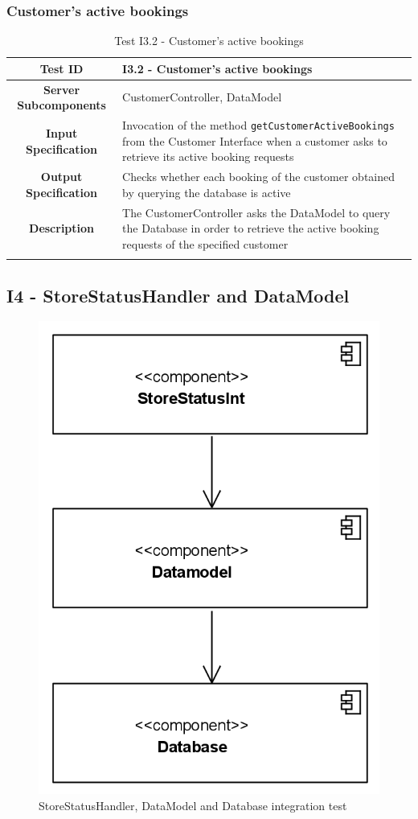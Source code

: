 \documentclass[a4paper,oneside,11pt]{book}
\begin{document}
    \subsubsection{Customer's active bookings}
    \begin{longtable}[c]{|>{\bfseries{}}c|H{.5\textwidth}|}
        \hline
        Test ID & I3.2 - Customer's active bookings \\ \hline
        Server Subcomponents & CustomerController, DataModel \\ \hline
        Input Specification & Invocation of the method \texttt{getCustomerActiveBookings} from the Customer Interface when a customer asks to retrieve its active booking requests \\ \hline
        Output Specification & Checks whether each booking of the customer obtained by querying the database is active \\ \hline
        Description & The CustomerController asks the DataModel to query the Database in order to retrieve the active booking requests of the specified customer \\ \hline
        \caption{Test I3.2 - Customer's active bookings}
        \label{table:test_I3.2}
    \end{longtable}
    
    \subsection{I4 - StoreStatusHandler and DataModel}
    \begin{figure}[H]
        \centering
        \includegraphics[width=.5\textwidth, height=\textheight, keepaspectratio]{pictures/integration_diagrams/integration_storestatushandler_datamodel.png}
        \caption{StoreStatusHandler, DataModel and Database integration test}
        \label{figure:integration_storestatushandler_datamodel}
    \end{figure}
    
\end{document}
